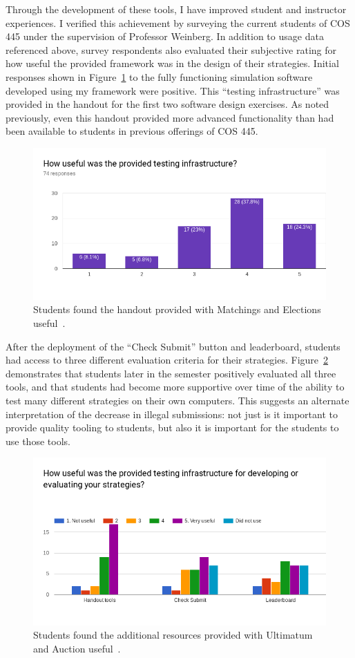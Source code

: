 \documentclass[pageno]{jpaper}
\begin{document}
Through the development of these tools, I have improved student and instructor experiences.
I verified this achievement by surveying the current students of COS 445 under the supervision of Professor Weinberg.
In addition to usage data referenced above, survey respondents also evaluated their subjective rating for how useful the provided framework was in the design of their strategies.
Initial responses shown in Figure~\ref{fig:useful1} to the fully functioning simulation software developed using my framework were positive.
This ``testing infrastructure'' was provided in the handout for the first two software design exercises.
As noted previously, even this handout provided more advanced functionality than had been available to students in previous offerings of COS 445.
\begin{figure}[hbt]
  \centering
  \includegraphics[width=0.75\linewidth]{useful1.png}
  \caption{Students found the handout provided with Matchings and Elections useful~\cite{survey12}.}\label{fig:useful1}
\end{figure}

After the deployment of the ``Check Submit'' button and leaderboard, students had access to three different evaluation criteria for their strategies.
Figure~\ref{fig:useful2} demonstrates that students later in the semester positively evaluated all three tools, and that students had become more supportive over time of the ability to test many different strategies on their own computers.
This suggests an alternate interpretation of the decrease in illegal submissions: not just is it important to provide quality tooling to students, but also it is important for the students to use those tools.
\begin{figure}[hbt]
  \centering
  \includegraphics[width=0.75\linewidth]{useful2.png}
  \caption{Students found the additional resources provided with Ultimatum and Auction useful~\cite{survey34}.}\label{fig:useful2}
\end{figure}
\end{document}
